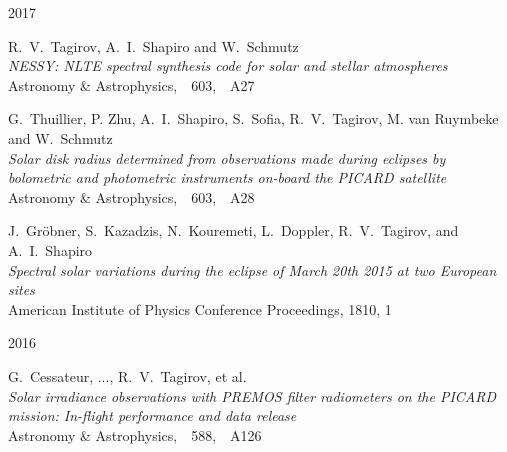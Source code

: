 

\begin{cventries}

  \cventry
    {}     %
    {}     %
    {}     %
    {2017} %
    {
      \begin{cvitems} %
        \item {R.~V.~Tagirov, A.~I.~Shapiro and W.~Schmutz\\
               \textit{NESSY: NLTE spectral synthesis code for solar and stellar atmospheres}\\
               Astronomy \& Astrophysics,\ \ 603,\ \ A27}\\
        \item {G.~Thuillier, P. Zhu, A.~I.~Shapiro, S.~Sofia, R.~V.~Tagirov, M. van Ruymbeke and W.~Schmutz\\
              \textit{Solar disk radius determined from observations made during eclipses by bolometric and photometric instruments on-board the PICARD satellite}\\
               Astronomy \& Astrophysics,\ \ 603,\ \ A28}\\
        \item {J.~Gr\"{o}bner, S.~Kazadzis, N.~Kouremeti, L.~Doppler, R.~V.~Tagirov, and A.~I.~Shapiro\\
              \textit{Spectral solar variations during the eclipse of March 20th 2015 at two European sites}\\
              American Institute of Physics Conference Proceedings, 1810, 1}
      \end{cvitems}
    }

  \cventry
    {}     %
    {}     %
    {}     %
    {2016} %
    {
      \begin{cvitems} %
        \item {G.~Cessateur, ..., R.~V.~Tagirov, et al.\\
               \textit{Solar irradiance observations with PREMOS filter radiometers on the PICARD mission: In-flight performance and data release}\\
               Astronomy \& Astrophysics,\ \ 588,\ \ A126}
      \end{cvitems}
    }


\end{cventries}
